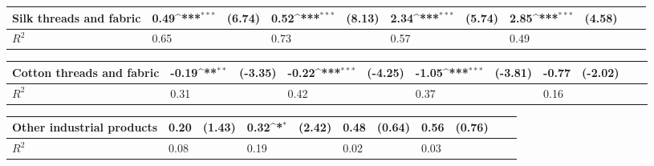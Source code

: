 \def\sym#1{\ifmmode^{#1}\else\(^{#1}\)\fi}
\begin{tabular}{p{4cm} p{1.4cm} p{1.2cm} p{1.5cm}  p{1.5cm} p{1.4cm} p{1.2cm} p{1.5cm} p{1.5cm}  p{1.5cm} p{1.5cm} }
\hline
Silk threads and fabric&     0.49\sym{***}&   (6.74)&     0.52\sym{***}&   (8.13)&     2.34\sym{***}&   (5.74)&     2.85\sym{***}&   (4.58)\\
\hline
\(R^{2}\)       &     0.65         &         &     0.73         &         &     0.57         &         &     0.49         &         \\
\end{tabular}
\def\sym#1{\ifmmode^{#1}\else\(^{#1}\)\fi}
\begin{tabular}{p{4cm} p{1.4cm} p{1.2cm} p{1.5cm}  p{1.5cm} p{1.4cm} p{1.2cm} p{1.5cm} p{1.5cm}  p{1.5cm} p{1.5cm} }
\hline
Cotton threads and fabric&    -0.19\sym{**} &  (-3.35)&    -0.22\sym{***}&  (-4.25)&    -1.05\sym{***}&  (-3.81)&    -0.77         &  (-2.02)\\
\hline
\(R^{2}\)       &     0.31         &         &     0.42         &         &     0.37         &         &     0.16         &         \\
\end{tabular}
\def\sym#1{\ifmmode^{#1}\else\(^{#1}\)\fi}
\begin{tabular}{p{4cm} p{1.4cm} p{1.2cm} p{1.5cm}  p{1.5cm} p{1.4cm} p{1.2cm} p{1.5cm} p{1.5cm}  p{1.5cm} p{1.5cm} }
\hline
Other industrial products&     0.20         &   (1.43)&     0.32\sym{*}  &   (2.42)&     0.48         &   (0.64)&     0.56         &   (0.76)\\
\hline
\(R^{2}\)       &     0.08         &         &     0.19         &         &     0.02         &         &     0.03         &         \\
\end{tabular}
